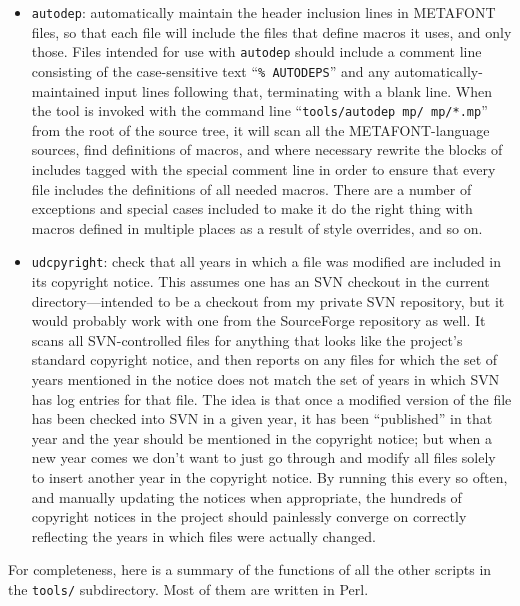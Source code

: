 \documentclass[14pt]{extarticle}
\begin{document}
\begin{itemize}

\item \texttt{autodep}: automatically maintain the header inclusion lines in
METAFONT files, so that each file will include the files that define macros
it uses, and only those.  Files intended for use with \texttt{autodep}
should include a comment line consisting of the case-sensitive text
``\texttt{\%\ AUTODEPS}'' and any automatically-maintained input lines
following that, terminating with a blank line.  When the tool is invoked
with the command line ``\texttt{tools/autodep mp/ mp/*.mp}'' from the root
of the source tree, it will scan all the METAFONT-language sources, find
definitions of macros, and where necessary rewrite the blocks of includes
tagged with the special comment line in order to ensure that every file
includes the definitions of all needed macros.  There are a number of
exceptions and special cases included to make it do the right thing with
macros defined in multiple places as a result of style overrides, and so on.

\item \texttt{udcpyright}: check that all years in which a file was modified
are included in its copyright notice.  This assumes one has an SVN checkout
in the current directory---intended to be a checkout from my private SVN
repository, but it would probably work with one from the SourceForge
repository as well.  It scans all SVN-controlled files for anything that
looks like the project's standard copyright notice, and then reports on any
files for which the set of years mentioned in the notice does not match the
set of years in which SVN has log entries for that file.  The idea is that
once a modified version of the file has been checked into SVN in a given
year, it has been ``published'' in that year and the year should be
mentioned in the copyright notice; but when a new year comes we don't want
to just go through and modify all files solely to insert another year in the
copyright notice.  By running this every so often, and manually updating the
notices when appropriate, the hundreds of copyright notices in the project
should painlessly converge on correctly reflecting the years in which files
were actually changed.

\end{itemize}

For completeness, here is a summary of the functions of all the other
scripts in the \texttt{tools/} subdirectory.  Most of them are written in
Perl.
\end{document}
